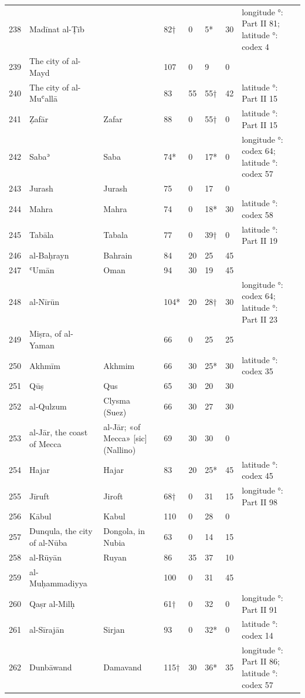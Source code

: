 {\begin{longtable}{R{8mm}L{42mm}L{34mm}R{7mm}R{6mm}R{6mm}R{6mm}L{24mm}}
238 & Madīnat al-Ṭīb &  & 82† & 0 & 5* & 30 & longitude °: Part II 81; latitude °: codex 4\\
239 & The city of al-Mayd &  & 107 & 0 & 9 & 0 & \\
240 & The city of al-Muʿallā &  & 83 & 55 & 55† & 42 & latitude °: Part II 15\\
241 & Ẓafār & Zafar & 88 & 0 & 55† & 0 & latitude °: Part II 15\\
242 & Sabaʾ & Saba & 74* & 0 & 17* & 0 & longitude °: codex 64; latitude °: codex 57\\
243 & Jurash & Jurash & 75 & 0 & 17 & 0 & \\
244 & Mahra & Mahra & 74 & 0 & 18* & 30 & latitude °: codex 58\\
245 & Tabāla & Tabala & 77 & 0 & 39† & 0 & latitude °: Part II 19\\
246 & al-Baḥrayn & Bahrain & 84 & 20 & 25 & 45 & \\
247 & ʿUmān & Oman & 94 & 30 & 19 & 45 & \\
248 & al-Nīrūn &  & 104* & 20 & 28† & 30 & longitude °: codex 64; latitude °: Part II 23\\
249 & Miṣra, of al-Yaman &  & 66 & 0 & 25 & 25 & \\
250 & Akhmīm & Akhmim & 66 & 30 & 25* & 30 & latitude °: codex 35\\
251 & Qūṣ & Qus & 65 & 30 & 20 & 30 & \\
252 & al-Qulzum & Clysma (Suez) & 66 & 30 & 27 & 30 & \\
253 & al-Jār, the coast of Mecca & al-Jār; «of Mecca» [sic] (Nallino) & 69 & 30 & 30 & 0 & \\
254 & Hajar & Hajar & 83 & 20 & 25* & 45 & latitude °: codex 45\\
255 & Jīruft & Jiroft & 68† & 0 & 31 & 15 & longitude °: Part II 98\\
256 & Kābul & Kabul & 110 & 0 & 28 & 0 & \\
257 & Dunqula, the city of al-Nūba & Dongola, in Nubia & 63 & 0 & 14 & 15 & \\
258 & al-Rūyān & Ruyan & 86 & 35 & 37 & 10 & \\
259 & al-Muḥammadiyya &  & 100 & 0 & 31 & 45 & \\
260 & Qaṣr al-Milḥ &  & 61† & 0 & 32 & 0 & longitude °: Part II 91\\
261 & al-Sīrajān & Sirjan & 93 & 0 & 32* & 0 & latitude °: codex 14\\
262 & Dunbāwand & Damavand & 115† & 30 & 36* & 35 & longitude °: Part II 86; latitude °: codex 57\\

\end{longtable}}
